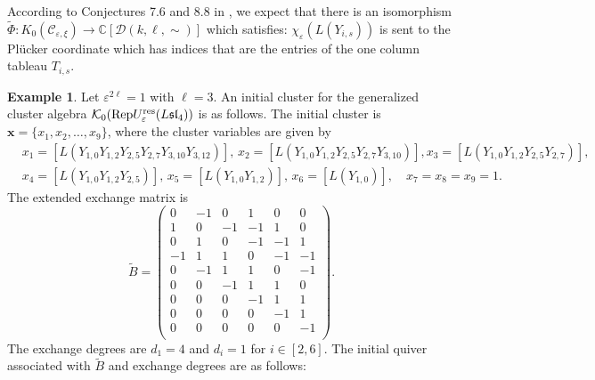 \documentclass[11pt, reqno]{amsart}
\theoremstyle{plain}
\theoremstyle{definition}
\newtheorem{example}[theorem]{Example}
\numberwithin{equation}{section}
\newcommand{\res}{{\rm res}}
\newcommand{\Rep}{{\rm Rep}}
\begin{document}
According to Conjectures 7.6 and 8.8 in \cite{Fra20}, we expect that there is an isomorphism $\widetilde{\Phi}: K_0(\mathcal{C}_{\varepsilon, \xi}) \to \mathbb{C}[\mathcal{D}(k,\ell,\sim)]$ which satisfies: $\chi_{\varepsilon}(L(Y_{i,s}))$ is sent to the Pl\"{u}cker coordinate which has indices that are the entries of the one column tableau $T_{i,s}$. 


\begin{example} 
Let $\varepsilon^{2 \ell}=1$ with $\ell =3$. An initial cluster for the generalized cluster algebra $\mathcal{K}_0(\Rep U_{\varepsilon}^{\res}({L\mathfrak{sl}_{4}}))$ is as follows. The initial cluster is $\mathbf{x}=\{x_1, x_2, \ldots, x_9\}$, where the cluster variables are given by
\begin{align*}
&x_1=[L(Y_{1,0} Y_{1,2} Y_{2,5}Y_{2,7} Y_{3,10} Y_{3,12})],\, x_2=[L(Y_{1,0} Y_{1,2} Y_{2,5}Y_{2,7} Y_{3,10})], x_3=[L(Y_{1,0} Y_{1,2} Y_{2,5}Y_{2,7})],\\
&x_4=[L(Y_{1,0} Y_{1,2} Y_{2,5})],\, x_5=[L(Y_{1,0} Y_{1,2})],\,x_6=[L(Y_{1,0})], \quad x_7=x_8=x_9=1.
\end{align*}
The extended exchange matrix is
\begin{equation}\label{extend exchhange matrix}
\tilde{B}=
\left(
  \begin{array}{cccccc}
    0 & -1 & 0 & 1 & 0 & 0 \\
    1 & 0 & -1 & -1 & 1 & 0 \\
    0 & 1 & 0 & -1 & -1 & 1\\
    -1 & 1 & 1 & 0 & -1 & -1 \\
    0 & -1 & 1 & 1 & 0 & -1\\
    0 & 0 & -1 & 1 & 1 & 0 \\
    0 & 0 & 0 & -1 & 1 & 1\\
    0 & 0 & 0 & 0 & -1 & 1 \\
    0 & 0 & 0 & 0 & 0 & -1\\
  \end{array}
\right).
\end{equation}
The exchange degrees are $d_1 = 4$ and $d_i = 1$ for $i \in[2,6]$. The initial quiver associated with $\tilde{B}$ and exchange degrees are as follows:
\\
{\small
{}}
\end{example}
\end{document}
